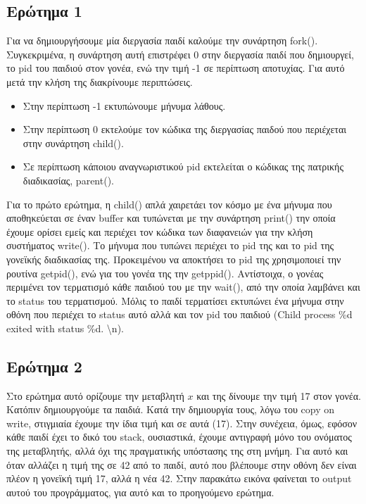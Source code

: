 \documentclass{article}
\begin{document}
	
	
	\subsection{Ερώτημα 1}
	Για να δημιουργήσουμε μία διεργασία παιδί καλούμε την συνάρτηση fork(). Συγκεκριμένα, η συνάρτηση αυτή επιστρέφει 0 στην διεργασία παιδί που δημιουργεί, το pid του παιδιού στον γονέα, ενώ την τιμή -1 σε περίπτωση αποτυχίας. Για αυτό μετά την κλήση της διακρίνουμε περιπτώσεις. \\
	
	\begin{itemize}
		\item Στην περίπτωση -1 εκτυπώνουμε μήνυμα λάθους.
		\item Στην περίπτωση 0 εκτελούμε τον κώδικα της διεργασίας παιδού που περιέχεται στην συνάρτηση child().
		\item Σε περίπτωση κάποιου αναγνωριστικού pid εκτελείται ο κώδικας της πατρικής διαδικασίας, parent().
	\end{itemize}
	
	\noindent Για το πρώτο ερώτημα, η child() απλά χαιρετάει τον κόσμο με ένα μήνυμα που αποθηκεύεται σε έναν buffer και τυπώνεται με την συνάρτηση print() την οποία έχουμε ορίσει εμείς και περιέχει τον κώδικα των διαφανειών για την κλήση συστήματος write(). Το μήνυμα που τυπώνει περιέχει το pid της και το pid της γονεϊκής διαδικασίας της. Προκειμένου να αποκτήσει το pid της χρησιμοποιεί την ρουτίνα getpid(), ενώ για του γονέα της την getppid(). Αντίστοιχα, ο γονέας περιμένει τον τερματισμό κάθε παιδιού του με την wait(), από την οποία λαμβάνει και το status του τερματισμού. Μόλις το παιδί τερματίσει εκτυπώνει ένα μήνυμα στην οθόνη που περιέχει το status αυτό αλλά και τον pid του παιδιού (Child process \%d exited with status \%d. \textbackslash n).
	
	\subsection{Ερώτημα 2}
	Στο ερώτημα αυτό ορίζουμε την μεταβλητή $x$ και της δίνουμε την τιμή 17 στον γονέα. Κατόπιν δημιουργούμε τα παιδιά. Κατά την δημιουργία τους, λόγω του copy on write, στιγμιαία έχουμε την ίδια τιμή και σε αυτά (17). Στην συνέχεια, όμως, εφόσον κάθε παιδί έχει το δικό του stack, ουσιαστικά, έχουμε αντιγραφή μόνο του ονόματος της μεταβλητής, αλλά όχι της πραγματικής υπόστασης της στη μνήμη. Για αυτό και όταν αλλάζει η τιμή της σε 42 από το παιδί, αυτό που βλέπουμε στην οθόνη δεν είναι πλέον η γονεϊκή τιμή 17, αλλά η νέα 42. Στην παρακάτω εικόνα φαίνεται το output αυτού του προγράμματος, για αυτό και το προηγούμενο ερώτημα.
	
\end{document}

